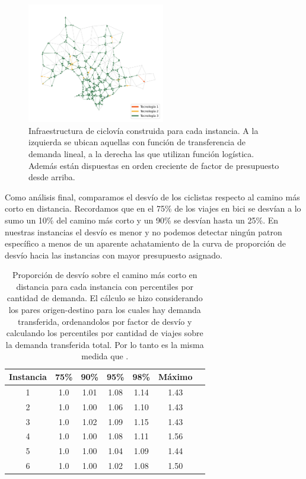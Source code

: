 \begin{figure}[h!]
  \includegraphics[width=6cm]{../resources/montevideo_d5000.0_inv_logit_1.6_budget_factor.png}
  \caption{Infraestructura de ciclovía construida para cada instancia. A la izquierda se ubican aquellas con función de transferencia de demanda lineal, a la derecha las que utilizan función logística. Además están dispuestas en orden creciente de factor de presupuesto desde arriba.}
  \label{fig:montevideo_instances_infras}
\end{figure}

Como análisis final, comparamos el desvío de los ciclistas respecto al camino más corto en distancia. Recordamos que en \cite{winters2010} el 75\% de los viajes en bici se desvían a lo sumo un 10\% del camino más corto y un 90\% se desvían hasta un 25\%. En nuestras instancias el desvío es menor y no podemos detectar ningún patron específico a menos de un aparente achatamiento de la curva de proporción de desvío hacia las instancias con mayor presupuesto asignado.

\begin{table}[h!]
  \centering
  \begin{tabular}{ccccccc}
    \toprule
      Instancia & 75\% & 90\% & 95\% & 98\% & Máximo \\
    \midrule
      1 & 1.0 & 1.01 & 1.08 & 1.14 & 1.43 \\
      2 & 1.0 & 1.00 & 1.06 & 1.10 & 1.43 \\
      3 & 1.0 & 1.02 & 1.09 & 1.15 & 1.43 \\
      4 & 1.0 & 1.00 & 1.08 & 1.11 & 1.56 \\
      5 & 1.0 & 1.00 & 1.04 & 1.09 & 1.44 \\
      6 & 1.0 & 1.00 & 1.02 & 1.08 & 1.50 \\
    \bottomrule
  \end{tabular}
  \caption{Proporción de desvío sobre el camino más corto en distancia para cada instancia con percentiles por cantidad de demanda. El cálculo se hizo considerando los pares origen-destino para los cuales hay demanda transferida, ordenandolos por factor de desvío y calculando los percentiles por cantidad de viajes sobre la demanda transferida total. Por lo tanto es la misma medida que \cite{winters2010}.}
  \label{table:montevideoshortestpathdeviation}
\end{table}

